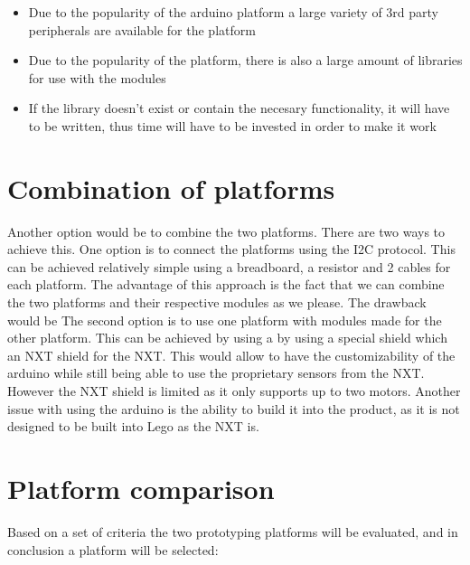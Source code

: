 \begin{itemize}
	\item Due to the popularity of the arduino platform a large variety of 3rd
	party peripherals are available for the platform
	\item Due to the popularity of the platform, there is also a large amount of
	libraries for use with the modules
	\item If the library doesn't exist or contain the necesary functionality, it
	will have to be written, thus time will have to be invested in order to make
	it work
\end{itemize}

\section{Combination of platforms}

Another option would be to combine the two platforms. There are two ways to achieve this.
One option is to connect the platforms using the I2C protocol. This can be achieved relatively
simple using a breadboard, a resistor and 2 cables for each platform. The advantage of this
approach is the fact that we can combine the two platforms and their respective modules as we please.
The drawback would be
The second option is to use one platform with modules made for the other platform.
This can be achieved by using a by using a special shield which  an NXT
shield for the NXT. This would allow to have the customizability of the arduino
while still being able to use the proprietary sensors from the NXT. However the
NXT shield is limited as it only supports up to two motors. Another issue with
using the arduino is the ability to build it into the product, as it is not
designed to be built into Lego as the NXT is.\nl

\section{Platform comparison}
Based on a set of criteria the two prototyping platforms will be evaluated, and
in conclusion a platform will be selected:

